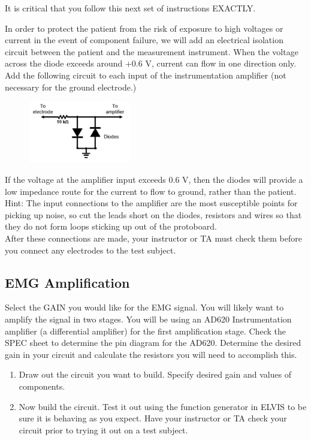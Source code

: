 \documentclass{article}
\begin{document}
\begin{warn}
It is critical that you follow this next set of instructions EXACTLY.	
\end{warn}

In order to protect the patient from the risk of exposure to high voltages or current in the event of component failure, we will add an electrical isolation circuit between the patient and the measurement instrument. When the voltage across the diode exceeds around +0.6 V, current can flow in one direction only. Add the following circuit to each input of the instrumentation amplifier (not necessary for the ground electrode.)\\

\begin{figure}[h]
    	\includegraphics[width=0.4\textwidth]{lab_3_fig_2.jpg}
    	\centering
		\end{figure}	

If the voltage at the amplifier input exceeds 0.6 V, then the diodes will provide a low impedance route for the current to flow to ground, rather than the patient. Hint: The input connections to the amplifier are the most susceptible points for picking up noise, so cut the leads short on the diodes, resistors and wires so that they do not form loops sticking up out of the protoboard.\\

After these connections are made, your instructor or TA must check them before you connect any electrodes to the test subject.

\subsection*{EMG Amplification}
Select the GAIN you would like for the EMG signal. You will likely want to amplify the signal in two stages. You will be using an AD620 Instrumentation amplifier (a differential amplifier) for the first amplification stage. Check the SPEC sheet to determine the pin diagram for the AD620. Determine the desired gain in your circuit and calculate the resistors you will need to accomplish this.

\begin{enumerate}
	\item Draw out the circuit you want to build. Specify desired gain and values of components.
	\item Now build the circuit. Test it out using the function generator in ELVIS to be sure it is behaving as you expect. Have your instructor or TA check your circuit prior to trying it out on a test subject.
\end{enumerate}
\end{document}
